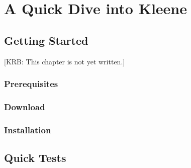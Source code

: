 \chapter{A Quick Dive into Kleene}

\section{Getting Started}

[KRB: This chapter is not yet written.]

\subsection{Prerequisites}
\subsection{Download}
\subsection{Installation}

\section{Quick Tests}
